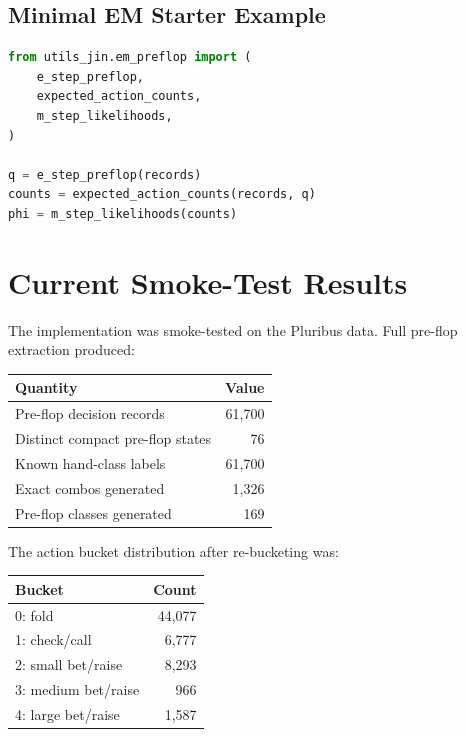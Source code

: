 \documentclass[11pt]{article}
\begin{document}
\subsection{Minimal EM Starter Example}

\begin{lstlisting}[language=Python]
from utils_jin.em_preflop import (
    e_step_preflop,
    expected_action_counts,
    m_step_likelihoods,
)

q = e_step_preflop(records)
counts = expected_action_counts(records, q)
phi = m_step_likelihoods(counts)
\end{lstlisting}

\section{Current Smoke-Test Results}

The implementation was smoke-tested on the Pluribus data. Full pre-flop
extraction produced:

\begin{center}
\begin{tabular}{lr}
\toprule
\textbf{Quantity} & \textbf{Value} \\
\midrule
Pre-flop decision records & 61{,}700 \\
Distinct compact pre-flop states & 76 \\
Known hand-class labels & 61{,}700 \\
Exact combos generated & 1{,}326 \\
Pre-flop classes generated & 169 \\
\bottomrule
\end{tabular}
\end{center}

The action bucket distribution after re-bucketing was:

\begin{center}
\begin{tabular}{lr}
\toprule
\textbf{Bucket} & \textbf{Count} \\
\midrule
0: fold & 44{,}077 \\
1: check/call & 6{,}777 \\
2: small bet/raise & 8{,}293 \\
3: medium bet/raise & 966 \\
4: large bet/raise & 1{,}587 \\
\bottomrule
\end{tabular}
\end{center}
\end{document}
